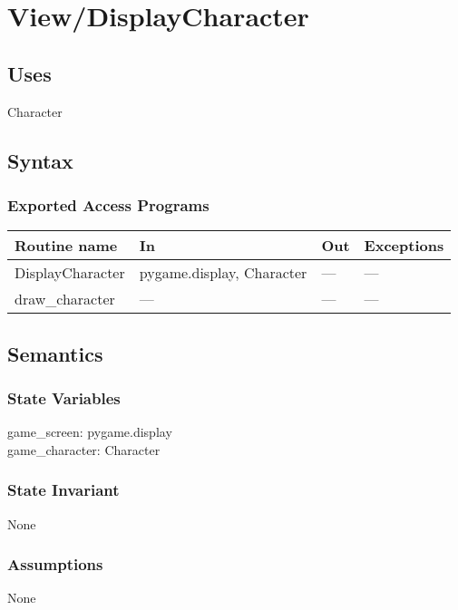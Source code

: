 \documentclass[12pt]{article}
\begin{document}
\section*{View/DisplayCharacter}

\subsection* {Uses}
Character
\subsection* {Syntax}

\subsubsection* {Exported Access Programs}

\begin{tabular}{| l | l | l | l |}
\hline
\textbf{Routine name} & \textbf{In} & \textbf{Out} & \textbf{Exceptions}\\
\hline
    DisplayCharacter & pygame.display, Character & --- & ---\\
\hline
    draw\_character & --- & --- & ---\\
\hline
\end{tabular}

\subsection* {Semantics}

\subsubsection* {State Variables}

game\_screen: pygame.display \\
game\_character: Character \\

\subsubsection* {State Invariant}

None

\subsubsection* {Assumptions}

None
\end{document}
